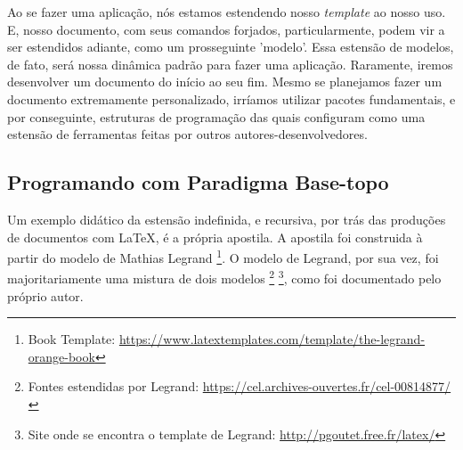 \documentclass[12pt, brazilian, a5paper]{abntex2} %
\begin{document}



Ao se fazer uma aplicação, nós estamos estendendo nosso \textit{template} ao nosso uso. E, nosso documento, com seus comandos forjados, particularmente, podem vir a ser estendidos adiante, como um prosseguinte 'modelo'. Essa estensão de modelos, de fato, será nossa dinâmica padrão para fazer uma aplicação. Raramente, iremos desenvolver um documento do início ao seu fim. Mesmo se planejamos fazer um documento extremamente personalizado, irríamos utilizar pacotes fundamentais, e por conseguinte, estruturas de programação das quais configuram como uma estensão de ferramentas feitas por outros autores-desenvolvedores.



\subsection{Programando com Paradigma Base-topo} 
Um exemplo didático da estensão indefinida, e recursiva, por trás das produções de documentos com \LaTeX, é a própria apostila. A apostila foi construida à partir do modelo de Mathias Legrand \footnote{Book Template: \url{
    https://www.latextemplates.com/template/the-legrand-orange-book}}. O modelo de Legrand, por sua vez, foi majoritariamente uma mistura de dois modelos
\footnote{Fontes estendidas por Legrand:
  \url{https://cel.archives-ouvertes.fr/cel-00814877/}} \footnote{Site onde se encontra o template de Legrand: \url{http://pgoutet.free.fr/latex/}}, como foi documentado pelo próprio autor.
\end{document}
